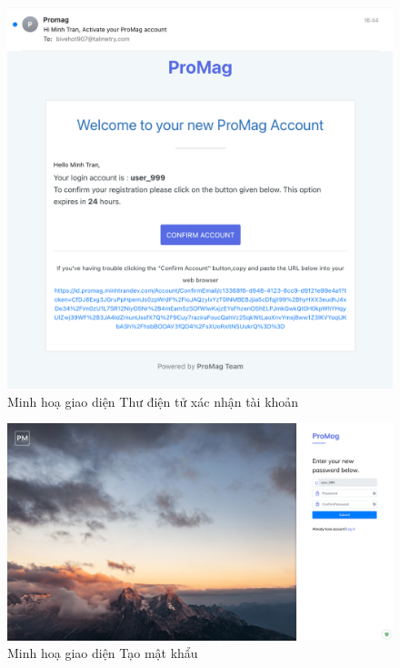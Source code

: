 \documentclass[../DoAn.tex]{subfiles}
\begin{document}
\begin{figure}[H]
    \centering
    \includegraphics[width=1.0\linewidth]{Hinhve/Screenshot_CreateAccountEmail.png}
    \caption{Minh hoạ giao diện Thư điện tử xác nhận tài khoản}
    \label{fig:Screenshot_CreateAccountEmail}
\end{figure}

\newpage

\begin{figure}[H]
    \centering
    \includegraphics[width=1.0\linewidth]{Hinhve/Screenshot_CreatePassword.png}
    \caption{Minh hoạ giao diện Tạo mật khẩu}
    \label{fig:Screenshot_CreatePassword}
\end{figure}
\end{document}
